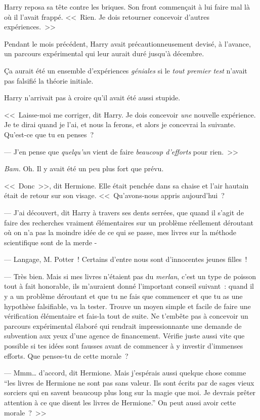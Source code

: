 Harry reposa sa tête contre les briques. Son front commençait à lui faire mal là où il l'avait frappé. <<~Rien. Je dois retourner concevoir d'autres expériences.~>>

Pendant le mois précédent, Harry avait précautionneusement devisé, à l'avance, un parcours expérimental qui leur aurait duré jusqu'à décembre.

Ça aurait été un ensemble d'expériences \emph{géniales} si le \emph{tout premier test} n'avait pas falsifié la théorie initiale.

Harry n'arrivait pas à croire qu'il avait été aussi stupide.

<<~Laisse-moi me corriger, dit Harry. Je dois concevoir \emph{une} nouvelle expérience. Je te dirai quand je l'ai, et nous la ferons, et alors je concevrai la suivante. Qu'est-ce que tu en penses~?

--- J'en pense que \emph{quelqu'un} vient de faire \emph{beaucoup d'efforts} pour rien.~>>

\emph{Bam.} Oh. Il y avait été un peu plus fort que prévu.

<<~Donc~>>, dit Hermione. Elle était penchée dans sa chaise et l'air hautain était de retour sur son visage. <<~Qu'avons-nous appris aujourd'hui~?

--- J'ai découvert, dit Harry à travers ses dents serrées, que quand il s'agit de faire des recherches vraiment élémentaires sur un problème réellement déroutant où on n'a pas la moindre idée de ce qui se passe, mes livres sur la méthode scientifique sont de la merde -

--- Langage, M. Potter~! Certains d'entre nous sont d'innocentes jeunes filles~!

--- Très bien. Mais si mes livres n'étaient pas du \emph{merlan}, c'est un type de poisson tout à fait honorable, ils m'auraient donné l'important conseil suivant~: quand il y a un problème déroutant et que tu ne fais que commencer et que tu as une hypothèse falsifiable, va la tester. Trouve un moyen simple et facile de faire une vérification élémentaire et fais-la tout de suite. Ne t'embête pas à concevoir un parcours expérimental élaboré qui rendrait impressionnante une demande de subvention aux yeux d'une agence de financement. Vérifie juste aussi vite que possible si tes idées sont fausses avant de commencer à y investir d'immenses efforts. Que penses-tu de cette morale~?

--- Mmm… d'accord, dit Hermione. Mais j'espérais aussi quelque chose comme “les livres de Hermione ne sont pas sans valeur. Ils sont écrits par de sages vieux sorciers qui en savent beaucoup plus long sur la magie que moi. Je devrais prêter attention à ce que disent les livres de Hermione.” On peut aussi avoir cette morale~?~>>

